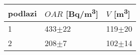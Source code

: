 \begin{tabular}{lll}
\toprule
podlazi & $OAR$ [\si{Bq/m^3}] & $V$ [\si{m^3}] \\
\midrule
1 &            433$\pm$22 &       119$\pm$20 \\
2 &             208$\pm$7 &       102$\pm$14 \\
\bottomrule
\end{tabular}
